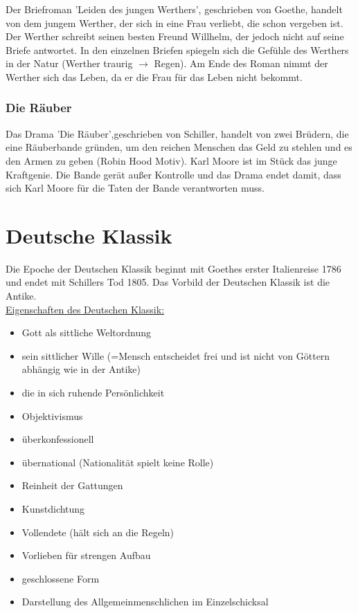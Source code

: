 \documentclass[12pt,a4paper]{article}
\begin{document}
Der Briefroman 'Leiden des jungen Werthers', geschrieben von Goethe, handelt von dem jungem Werther, der sich in eine Frau verliebt, die schon vergeben ist. Der Werther schreibt seinen besten Freund Willhelm, der jedoch nicht auf seine Briefe antwortet. In den einzelnen Briefen spiegeln sich die Gefühle des Werthers in der Natur (Werther traurig $\rightarrow$ Regen). Am Ende des Roman nimmt der Werther sich das Leben, da er die Frau für das Leben nicht bekommt.

\subsubsection{Die Räuber}

Das Drama 'Die Räuber',geschrieben von Schiller, handelt von zwei Brüdern, die eine Räuberbande gründen, um den reichen Menschen das Geld zu stehlen und es den Armen zu geben (Robin Hood Motiv). Karl Moore ist im Stück das junge Kraftgenie. Die Bande gerät außer Kontrolle und das Drama endet damit, dass sich Karl Moore für die Taten der Bande verantworten muss.

\newpage

\section{Deutsche Klassik}

Die Epoche der Deutschen Klassik beginnt mit Goethes erster Italienreise 1786 und endet mit Schillers Tod 1805. Das Vorbild der Deutschen Klassik ist die Antike.\\

\underline{Eigenschaften des Deutschen Klassik:}

\begin{itemize}
\item Gott als sittliche Weltordnung
\item sein sittlicher Wille (=Mensch entscheidet frei und ist nicht von Göttern abhängig wie in der Antike)
\item die in sich ruhende Persönlichkeit
\item Objektivismus
\item überkonfessionell
\item übernational (Nationalität spielt keine Rolle)
\item Reinheit der Gattungen
\item Kunstdichtung
\item Vollendete (hält sich an die Regeln)
\item Vorlieben für strengen Aufbau
\item geschlossene Form
\item Darstellung des Allgemeinmenschlichen im Einzelschicksal
\end{itemize}
\end{document}
